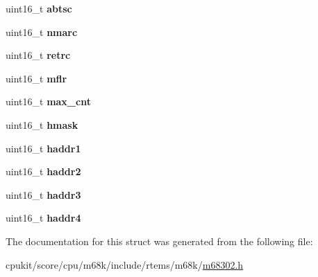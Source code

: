 \begin{DoxyCompactItemize}
\item 
\mbox{\label{structm302__SCC__HdlcSpecific__t_ab665c4d96125b8f34a5f26b91db4328c}} 
uint16\+\_\+t {\bfseries abtsc}
\item 
\mbox{\label{structm302__SCC__HdlcSpecific__t_adda01409f5cefacf24141a9be5392c28}} 
uint16\+\_\+t {\bfseries nmarc}
\item 
\mbox{\label{structm302__SCC__HdlcSpecific__t_accaf2d8d3ee403bc03d4d52108491db4}} 
uint16\+\_\+t {\bfseries retrc}
\item 
\mbox{\label{structm302__SCC__HdlcSpecific__t_a85fde02485b0ebd1096c587dfe7ee494}} 
uint16\+\_\+t {\bfseries mflr}
\item 
\mbox{\label{structm302__SCC__HdlcSpecific__t_a4cfa60065708c30976dd9a37d71488b0}} 
uint16\+\_\+t {\bfseries max\+\_\+cnt}
\item 
\mbox{\label{structm302__SCC__HdlcSpecific__t_a79da29e0a3f41c25550f67cc141cfba2}} 
uint16\+\_\+t {\bfseries hmask}
\item 
\mbox{\label{structm302__SCC__HdlcSpecific__t_a6543a3850a78eec0e595bb4f76c6a8d1}} 
uint16\+\_\+t {\bfseries haddr1}
\item 
\mbox{\label{structm302__SCC__HdlcSpecific__t_a6d529a71e3fc05ff41986977e2efe2e7}} 
uint16\+\_\+t {\bfseries haddr2}
\item 
\mbox{\label{structm302__SCC__HdlcSpecific__t_aa336b12784000759b112d68e5fd131bf}} 
uint16\+\_\+t {\bfseries haddr3}
\item 
\mbox{\label{structm302__SCC__HdlcSpecific__t_afb1ccc1fd20250a7539406521f8c5959}} 
uint16\+\_\+t {\bfseries haddr4}
\end{DoxyCompactItemize}


The documentation for this struct was generated from the following file\+:\begin{DoxyCompactItemize}
\item 
cpukit/score/cpu/m68k/include/rtems/m68k/\mbox{\hyperlink{m68302_8h}{m68302.\+h}}\end{DoxyCompactItemize}
